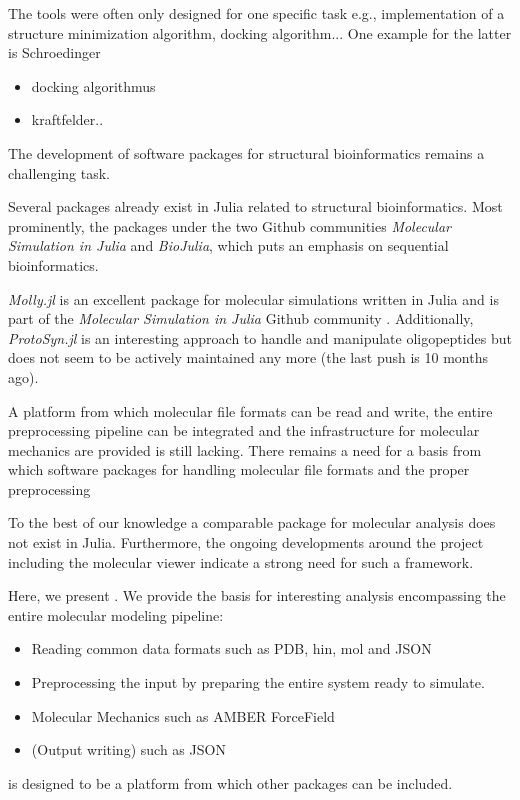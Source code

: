The tools were often only designed for one specific task e.g., implementation of a structure minimization algorithm, docking algorithm... 
One example for the latter is Schroedinger 
~\cite{kohlbacher_ballrapid_2000}


\begin{itemize}
	\item docking algorithmus
	\item kraftfelder..
\end{itemize}
The development of software packages for structural bioinformatics remains a challenging task. 

Several packages already exist in Julia related to structural bioinformatics. Most prominently, the packages under the two Github communities \textit{Molecular Simulation in Julia} and \textit{BioJulia}, which puts an emphasis on sequential bioinformatics. 

\textit{Molly.jl} is an excellent package for molecular simulations written in Julia and is part of the \textit{Molecular Simulation in Julia} Github community \cite{Greener2024}. 
Additionally, \textit{ProtoSyn.jl} is an interesting approach to handle and manipulate oligopeptides but does not seem to be actively maintained any more (the last push is 10 months ago).

A platform from which molecular file formats can be read and write, the entire preprocessing pipeline can be integrated and the infrastructure for molecular mechanics are provided is still lacking. 
There remains a need for a basis from which software packages for handling molecular file formats and the proper preprocessing


To the best of our knowledge a comparable package for molecular analysis does not exist in Julia. Furthermore, the ongoing developments around the \ball project including the molecular viewer indicate a strong need for such a framework. 


Here, we present \biochem. We provide the basis for interesting analysis encompassing the entire molecular modeling pipeline:
\begin{itemize}
	\item Reading common data formats such as PDB, hin, mol and JSON
	\item Preprocessing the input by preparing the entire system ready to simulate.
	\item Molecular Mechanics such as AMBER ForceField
	\item (Output writing) such as JSON
\end{itemize}

\biochem is designed to be a platform from which other packages can be included.
